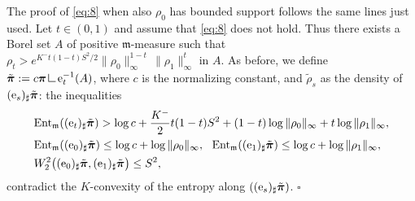 \documentclass[reqno,11pt]{article}
\numberwithin{equation}{section}
\newcommand{\mm}{{\mbox{\boldmath$m$}}}
\newcommand{\ppi}{{\mbox{\boldmath$\pi$}}}
\newenvironment{proof}{\removelastskip\par\medskip   %
\noindent{\em Proof.}
\rm}{\penalty-20\null\hfill$\square$\par\medbreak}
\newcommand{\e}{{\rm{e}}}                           %
\newcommand{\res}{\mathop{\hbox{\vrule height 7pt width .5pt depth 0pt
\vrule height .5pt width 6pt depth 0pt}}\nolimits} %
\newcommand{\entr}[2]{{\rm Ent}_{#2}(#1)}              %
\renewcommand{\mm}{\mathfrak m}
\begin{document}
\begin{proof}
The proof of \eqref{eq:8} when also $\rho_0$ has bounded support
follows the same lines just used. Let $t\in(0,1)$ and assume that
\eqref{eq:8} does not hold. Thus there exists a Borel set $A$ of
positive $\mm$-measure such that $\rho_t>
e^{K^-t(1-t)S^2/2}\|\rho_0\|^{1-t}_\infty\,\|\rho_1\|^t_\infty$ in
$A$. As before, we define $\tilde\ppi:=c\ppi\res{\e_t^{-1}(A)}$,
where $c$ is the normalizing constant, and $\tilde\rho_s$ as the
density of $(\e_s)_\sharp\tilde\ppi$: the inequalities
\[
\begin{split}
&\entr{(\e_t)_\sharp\tilde\ppi}\mm>\log c+
\frac{K^-}{2}t(1-t)S^2+(1-t)\log\|\rho_0\|_\infty+t\log\|\rho_1\|_\infty,\\
&\entr{(\e_0)_\sharp\tilde\ppi}\mm\leq \log
c+\log\|\rho_0\|_\infty,\,\,\,\,
\entr{(\e_1)_\sharp\tilde\ppi}\mm\leq\log c+\log\|\rho_1\|_\infty,\\
&W_2^2\big((\e_0)_\sharp\tilde\ppi,(\e_1)_\sharp\tilde\ppi\big)\leq
S^2,
\end{split}
\]
contradict the $K$-convexity of the entropy along  $((\e_s)_\sharp\tilde\ppi)$.
\end{proof}
\end{document}
